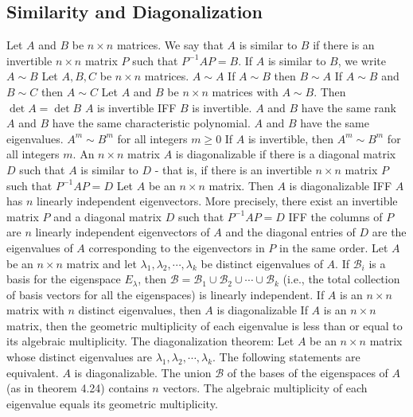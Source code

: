 \documentclass{article}
\begin{document}
        \subsection{Similarity and Diagonalization}
        \begin{outline}
            \1 Let $A$ and $B$ be \(n\times n\) matrices. We say that $A$ is similar to $B$ if there is an invertible \(n\times n\) matrix $P$ such that \(P^{-1}AP=B\). If \(A\) is similar to \(B\), we write \(A\sim B\)
            \1 Let \(A,B,C\) be \(n\times n\) matrices. 
                \2 \(A\sim A\)
                \2 If \(A\sim B\) then \(B\sim A\)
                \2 If \(A\sim B\) and \(B\sim C\) then \(A\sim C\)
            \1 Let \(A\) and \(B\) be \(n\times n\) matrices with \(A\sim B\). Then 
                \2 \(\det A=\det B\)
                \2 \(A\) is invertible IFF \(B\) is invertible. 
                \2 \(A\) and \(B\) have the same rank 
                \2 \(A\) and \(B\) have the same characteristic polynomial. 
                \2 \(A\) and \(B\) have the same eigenvalues. 
                \2 \(A^m\sim B^m\) for all integers \(m\geq 0\)
                \2 If \(A\) is invertible, then \(A^m\sim B^m\) for all integers \(m\). 
            \1 An \(n\times n\) matrix \(A\) is diagonalizable if there is a diagonal matrix \(D\) such that \(A\) is similar to \(D\) - that is, if there is an invertible \(n\times n\) matrix \(P\) such that \(P^{-1}AP=D\)
            \1 Let \(A\) be an \(n\times n\) matrix. Then \(A\) is diagonalizable IFF $A$ has \(n\) linearly independent eigenvectors. More precisely, there exist an invertible matrix $P$ and a diagonal matrix $D$ such that \(P^{-1}AP=D\) IFF the columns of $P$ are \(n\) linearly independent eigenvectors of \(A\) and the diagonal entries of $D$ are the eigenvalues of $A$ corresponding to the eigenvectors in $P$ in the same order. 
            \1 Let \(A\) be an \(n\times n\) matrix and let \(\lambda_1,\lambda_2,\cdots,\lambda_k\) be distinct eigenvalues of $A$. If \(\mathcal B_i\) is a basis for the eigenspace \(E_\lambda\), then \(\mathcal B=\mathcal B_1\cup\mathcal B_2\cup\cdots\cup\mathcal B_k\) (i.e., the total collection of basis vectors for all the eigenspaces) is linearly independent. 
            \1 If $A$ is an \(n\times n\) matrix with \(n\) distinct eigenvalues, then \(A\) is diagonalizable
            \1 If $A$ is an \(n\times n\) matrix, then the geometric multiplicity of each eigenvalue is less than or equal to its algebraic multiplicity. 
            \1 The diagonalization theorem: Let $A$ be an \(n\times n\) matrix whose distinct eigenvalues are \(\lambda_1,\lambda_2,\cdots,\lambda_k\). The following statements are equivalent. 
                \2 $A$ is diagonalizable. 
                \2 The union \(\mathcal B\) of the bases of the eigenspaces of $A$ (as in theorem 4.24) contains \(n\) vectors. 
                \2 The algebraic multiplicity of each eigenvalue equals its geometric multiplicity. 

        \end{outline}
\end{document}
